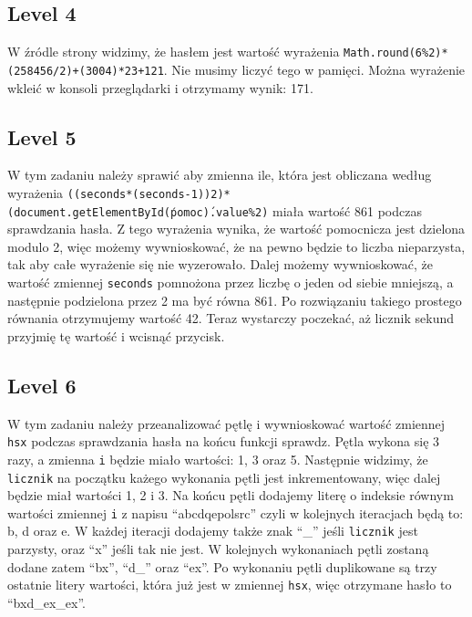 \documentclass[11pt]{article}
\begin{document}
\subsection{Level 4}

W źródle strony widzimy, że hasłem jest wartość wyrażenia \newline \texttt{Math.round(6\%2)*(258456/2)+(300\/4)*2\/3+121}. \newline Nie musimy liczyć tego w pamięci. Można wyrażenie wkleić w konsoli przeglądarki i otrzymamy wynik: 171.

\subsection{Level 5}

W tym zadaniu należy sprawić aby zmienna ile, która jest obliczana według wyrażenia \newline \texttt{((seconds*(seconds-1))\/2)*(document.getElementById(\'pomoc\').value\%2)} \newline miała wartość 861 podczas sprawdzania hasła. Z tego wyrażenia wynika, że wartość pomocnicza jest dzielona modulo 2, więc możemy wywnioskować, że na pewno będzie to liczba nieparzysta, tak aby całe wyrażenie się nie wyzerowało. Dalej możemy wywnioskować, że wartość zmiennej \texttt{seconds} pomnożona przez liczbę o jeden od siebie mniejszą, a następnie podzielona przez 2 ma być równa 861. Po rozwiązaniu takiego prostego równania otrzymujemy wartość 42. Teraz wystarczy poczekać, aż licznik sekund przyjmię tę wartość i wcisnąć przycisk.

\subsection{Level 6}

W tym zadaniu należy przeanalizować pętlę i wywnioskować wartość zmiennej \texttt{hsx} podczas sprawdzania hasła na końcu funkcji sprawdz. Pętla wykona się 3 razy, a zmienna \texttt{i} będzie miało wartości: 1, 3 oraz 5. Następnie widzimy, że \texttt{licznik} na początku każego wykonania pętli jest inkrementowany, więc dalej będzie miał wartości 1, 2 i 3. Na końcu pętli dodajemy literę o indeksie równym wartości zmiennej \texttt{i} z napisu ``abcdqepolsrc'' czyli w kolejnych iteracjach będą to: b, d oraz e. W każdej iteracji dodajemy także znak ``\_'' jeśli \texttt{licznik} jest parzysty, oraz ``x'' jeśli tak nie jest. W kolejnych wykonaniach pętli zostaną dodane zatem ``bx'', ``d\_'' oraz ``ex''. Po wykonaniu pętli duplikowane są trzy ostatnie litery wartości, która już jest w zmiennej \texttt{hsx}, więc otrzymane hasło to ``bxd\_ex\_ex''.
\end{document}

